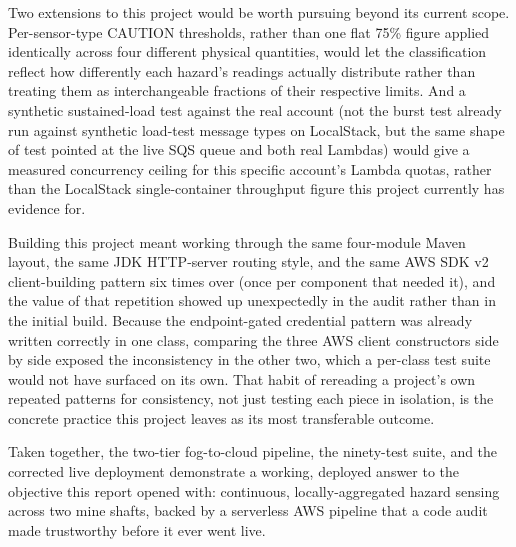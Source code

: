 \documentclass[conference]{IEEEtran}
\begin{document}
Two extensions to this project would be worth pursuing beyond its current scope. Per-sensor-type CAUTION thresholds, rather than one flat 75\% figure applied identically across four different physical quantities, would let the classification reflect how differently each hazard's readings actually distribute rather than treating them as interchangeable fractions of their respective limits. And a synthetic sustained-load test against the real account (not the burst test already run against synthetic load-test message types on LocalStack, but the same shape of test pointed at the live SQS queue and both real Lambdas) would give a measured concurrency ceiling for this specific account's Lambda quotas, rather than the LocalStack single-container throughput figure this project currently has evidence for.

Building this project meant working through the same four-module Maven layout, the same JDK HTTP-server routing style, and the same AWS SDK v2 client-building pattern six times over (once per component that needed it), and the value of that repetition showed up unexpectedly in the audit rather than in the initial build. Because the endpoint-gated credential pattern was already written correctly in one class, comparing the three AWS client constructors side by side exposed the inconsistency in the other two, which a per-class test suite would not have surfaced on its own. That habit of rereading a project's own repeated patterns for consistency, not just testing each piece in isolation, is the concrete practice this project leaves as its most transferable outcome.

Taken together, the two-tier fog-to-cloud pipeline, the ninety-test suite, and the corrected live deployment demonstrate a working, deployed answer to the objective this report opened with: continuous, locally-aggregated hazard sensing across two mine shafts, backed by a serverless AWS pipeline that a code audit made trustworthy before it ever went live.




\end{document}
